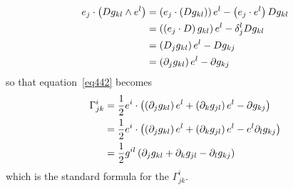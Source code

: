 \begin{align}
  e_{j}\cdot\left ( {Dg_{kl}\wedge e^{l}} \right ) &= \left ( {e_{j}\cdot\left ( {Dg_{kl}} \right )} \right ) e^{l}-\left ( {e_{j}\cdot e^{l}} \right ) Dg_{kl} \nonumber \\
                                    &= \left ( {\left ( {e_{j}\cdot D} \right ) g_{kl}} \right ) e^{l}-\delta_{j}^{l}Dg_{kl} \nonumber \\
                                    &= \left ( {D_{j}g_{kl}} \right ) e^{l}-Dg_{kj} \nonumber \\
                                    &= \left ( {\partial_{j}g_{kl}} \right ) e^{l}-\partial g_{kj}
\end{align}
so that equation~\ref{eq442} becomes
\begin{align}
 \Gamma^{i}_{jk} &= \displaystyle\frac{1}{2} e^{i}\cdot \left ( {\left ( {\partial_{j}g_{kl}} \right ) e^{l}+\left ( {\partial_{k}g_{jl}} \right ) e^{l}-\partial g_{kj}} \right ) \nonumber \\
                 &= \displaystyle\frac{1}{2} e^{i}\cdot \left ( {\left ( {\partial_{j}g_{kl}} \right ) e^{l}+\left ( {\partial_{k}g_{jl}} \right ) e^{l}-e^{l}\partial_{l} g_{kj}} \right ) \nonumber \\
                 &= \displaystyle\frac{1}{2} g^{il} \left ( {\partial_{j}g_{kl}+\partial_{k}g_{jl}-\partial_{l} g_{kj}} \right )
\end{align}
which is the standard formula for the $\Gamma^{i}_{jk}$. 

